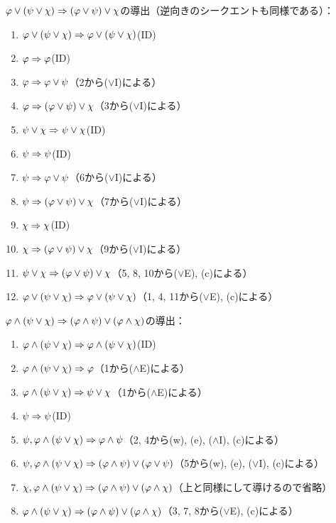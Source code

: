 \(\varphi \lor \paren{\psi \lor \chi} \sequent \paren{\varphi \lor \psi} \lor \chi\)の導出（逆向きのシークエントも同様である）：
\begin{enumerate}
	\item \(\varphi \lor \paren{\psi \lor \chi} \sequent \varphi \lor \paren{\psi \lor \chi}\)\quad (ID)
	\item \(\varphi \Rightarrow \varphi\)\quad (ID)
	\item \(\varphi \Rightarrow \varphi \lor \psi\)\quad （2から(\(\lor\)I)による）
	\item \(\varphi \sequent \paren{\varphi \lor \psi} \lor \chi\)\quad （3から(\(\lor\)I)による）
	\item \(\psi \lor \chi \Rightarrow \psi \lor \chi\)\quad (ID)
	\item \(\psi \Rightarrow \psi\)\quad (ID)
	\item \(\psi \Rightarrow \varphi \lor \psi\)\quad （6から(\(\lor\)I)による）
	\item \(\psi \sequent \paren{\varphi \lor \psi} \lor \chi\)\quad （7から(\(\lor\)I)による）
	\item \(\chi \Rightarrow \chi\)\quad (ID)
	\item \(\chi \sequent \paren{\varphi \lor \psi} \lor \chi\)\quad （9から(\(\lor\)I)による）
	\item \(\psi \lor \chi \sequent \paren{\varphi \lor \psi} \lor \chi\)\quad （5, 8, 10から(\(\lor\)E), (c)による）
	\item \(\varphi \lor \paren{\psi \lor \chi} \sequent \varphi \lor \paren{\psi \lor \chi}\)\quad （1, 4, 11から(\(\lor\)E), (c)による）
\end{enumerate}

\(\varphi \land \paren{\psi \lor \chi} \sequent \paren{\varphi \land \psi} \lor \paren{\varphi \land \chi}\)の導出：
\begin{enumerate}
	\item \(\varphi \land \paren{\psi \lor \chi} \sequent \varphi \land \paren{\psi \lor \chi}\)\quad (ID)
	\item \(\varphi \land \paren{\psi \lor \chi} \sequent \varphi\)\quad （1から(\(\land\)E)による）
	\item \(\varphi \land \paren{\psi \lor \chi} \sequent \psi \lor \chi\)\quad （1から(\(\land\)E)による）
	\item \(\psi \Rightarrow \psi\)\quad (ID)
	\item \(\psi, \varphi \land \paren{\psi \lor \chi} \sequent \varphi \land \psi\)\quad （2, 4から(w), (e), (\(\land\)I), (c)による）
	\item \(\psi, \varphi \land \paren{\psi \lor \chi} \sequent \paren{\varphi \land \psi} \lor \paren{\varphi \lor \psi}\)\quad （5から(w), (e), (\(\lor\)I), (c)による）
	\item \(\chi, \varphi \land \paren{\psi \lor \chi} \sequent \paren{\varphi \land \psi} \lor \paren{\varphi \land \chi}\)\quad （上と同様にして導けるので省略）
	\item \(\varphi \land \paren{\psi \lor \chi} \sequent \paren{\varphi \land \psi} \lor \paren{\varphi \land \chi}\)\quad （3, 7, 8から(\(\lor\)E), (c)による）
\end{enumerate}
